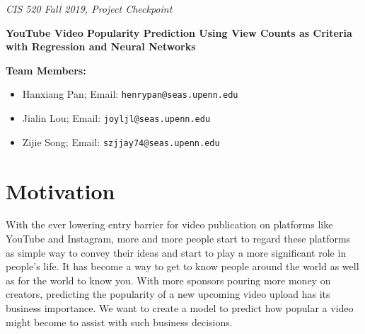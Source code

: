 \documentclass[english]{article}
\begin{document}

\emph{\footnotesize{CIS 520 Fall 2019, Project Checkpoint}}


\vspace{12pt}



\textbf{\Large{YouTube Video Popularity Prediction Using View Counts as Criteria with Regression and Neural Networks}}

\vspace{1cm}

\textbf{Team Members:}

\begin{itemize}
 \item Hanxiang Pan; Email: \texttt{henrypan@seas.upenn.edu}
 \item Jialin Lou; Email: \texttt{joyljl@seas.upenn.edu}
 \item Zijie Song; Email: \texttt{szjjay74@seas.upenn.edu} 
\end{itemize}

\hline





\section{Motivation}

With the ever lowering entry barrier for video publication on platforms like YouTube and Instagram, more and more people start to regard these platforms as simple way to convey their ideas and start to play a more significant role in people's life. It has become a way to get to know people around the world as well as for the world to know you. With more sponsors pouring more money on creators, predicting the popularity of a new upcoming video upload has its business importance. We want to create a model to predict how popular a video might become to assist with such business decisions.
\end{document}
